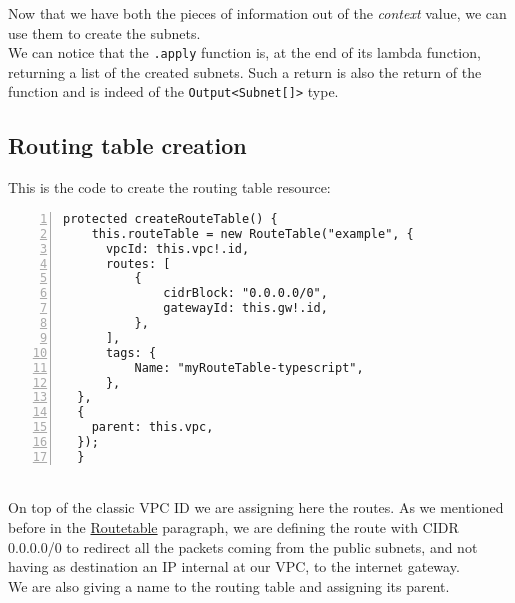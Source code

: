 Now that we have both the pieces of information out of the \textit{context} value, we can use them to create the subnets.\\
We can notice that the \texttt{.apply} function is, at the end of its lambda function, returning a list of the created subnets.
Such a return is also the return of the function and is indeed of the \texttt{Output<Subnet[]>} type.

\subsection{Routing table creation}
This is the code to create the routing table resource:
\begin{lstlisting}[numbers=left, numberstyle=\tiny, numbersep=-5pt, stepnumber=1]
  protected createRouteTable() {
    this.routeTable = new RouteTable("example", {
      vpcId: this.vpc!.id,
      routes: [
          {
              cidrBlock: "0.0.0.0/0",
              gatewayId: this.gw!.id,
          },
      ],
      tags: {
          Name: "myRouteTable-typescript",
      },
  },
  {
    parent: this.vpc,
  });
  }
\end{lstlisting}\mbox{}\\
On top of the classic VPC ID we are assigning here the routes.
As we mentioned before in the \hyperref[sssec:routetable]{Routetable} paragraph, we are defining the route with CIDR 0.0.0.0/0 to redirect all the packets coming from the public subnets, and not having as destination an IP internal at our VPC, to the internet gateway.\\
We are also giving a name to the routing table and assigning its parent.


